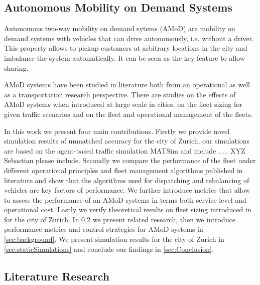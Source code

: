 \subsection{Autonomous Mobility on Demand Systems}

Autonomous two-way mobility on demand sytems (AMoD) are mobility on demand systems with vehicles that can drive autonomously, i.e. without a driver. This property allows to pickup customers at arbitrary locations in the city and imbalance the system automatically. It can be seen as the key feature to allow sharing.

AMoD systems have been studied in literature both from an operational as well as a transportation research perspective. There are studies on the effects of AMoD systems when introduced at large scale in cities, on the fleet sizing for given traffic scenarios and on the fleet and operational management of the fleets.

In this work we present four main contributions. Firstly we provide novel simulation results of unmatched accuracy for the city of Zurich, our simulations are based on the agent-based traffic simulation MATSim and include ..... XYZ Sebastian please include. Secondly we compare the performance of the fleet under different operational principles and fleet management algorithms published in literature and show that the algorithms used for dispatching and rebalancing of vehicles are key factors of performance. We further introduce metrics that allow to assess the performance of an AMoD systems in terms both service level and operational cost. Lastly we verify theoretical results on fleet sizing introduced in \cite{spieser2014toward} for the city of Zurich. In \ref{subs:literatureResearch} we present related research, then we introduce performance metrics and control strategies for AMoD systems in \ref{sec:background}. We present simulation results for the city of Zurich in \ref{sec:staticSimulations} and conclude our findings in \ref{sec:Conclusion}.


\subsection{Literature Research}
\label{subs:literatureResearch}

